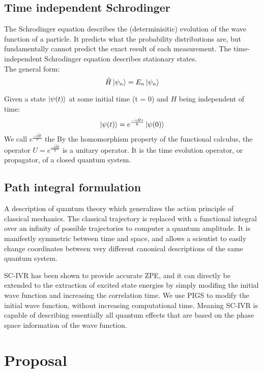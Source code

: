 \documentclass[12pt,letterpaper,oneside,final,titlepage]{article}               %
\numberwithin{equation}{section} %
\newcommand{\emiHt}{e^{\frac{-i\hat{H}t}{\hbar}}}
\begin{document}
\subsection{Time independent Schrodinger}
The Schrodinger equation describes the (determinisitic) evolution of the wave function of a particle.
It predicts what the probability distributions are, but fundamentally cannot predict the exact result of each measurement.
The time-independent Schrodinger equation describes stationary states. \\
The general form:
\begin{equation}
    \hat{H}\ket{\psi_{n}} = E_{n}\ket{\psi_{n}}
\end{equation}

Given a state $\ket{\psi(t)}$ at some initial time (t = 0) and $H$ being independent of time:
\begin{equation}
    \ket{\psi(t)} = \emiHt\ket{\psi(0)}
\end{equation}
We call $\emiHt$ the 
By the homomorphism property of the functional calculus, the operator $U = \emiHt$ is a unitary operator.
It is the time evolution operator, or propagator, of a closed quantum system. 



\subsection{Path integral formulation}
A description of quantum theory which generalizes the action principle of classical mechanics.
The classical trajectory is replaced with a functional integral over an infinity of possible trajectories to computer a quantum amplitude.
It is manifestly symmetric between time and space, and allows a scientist to easily change coordinates between very different canonical descriptions of the same quantum system. 

SC-IVR has been shown to provide accurate ZPE, and it can directly be extended to the extraction of excited state energies by simply modifing the initial wave function and increasing the correlation time. We use PIGS to modify the initial wave function, without increasing computational time. Meaning SC-IVR is capable of describing essentially all quantum effects that are based on the phase space information of the wave function.
\section{Proposal}
\end{document}
